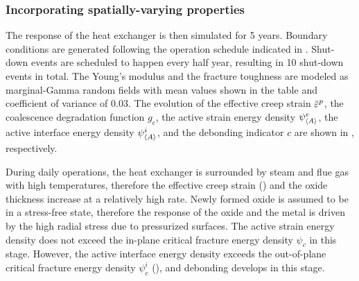 \subsubsection{Incorporating spatially-varying properties}

The response of the heat exchanger is then simulated for 5 years. Boundary conditions are generated following the operation schedule indicated in . Shut-down events are scheduled to happen every half year, resulting in 10 shut-down events in total. The Young's modulus and the fracture toughness are modeled as marginal-Gamma random fields with mean values shown in the table  and coefficient of variance of $0.03$.
The evolution of the effective creep strain $\ep$, the coalescence degradation function $g_c$, the active strain energy density $\psi^e_{\left< A \right>}$, the active interface energy density $\psi^i_{\left< A \right>}$, and the debonding indicator $c$ are shown in , respectively.





During daily operations, the heat exchanger is surrounded by steam and flue gas with high temperatures, therefore the effective creep strain () and the oxide thickness increase at a relatively high rate. Newly formed oxide is assumed to be in a stress-free state, therefore the response of the oxide and the metal is driven by the high radial stress due to pressurized surfaces. The active strain energy density does not exceed the in-plane critical fracture energy density $\psi_c$ in this stage. However, the active interface energy density exceeds the out-of-plane critical fracture energy density $\psi_c^i$ (), and debonding develops in this stage.

